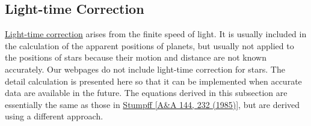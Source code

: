 \documentclass[12pt]{article}
\begin{document}
\subsection{Light-time Correction}

\href{https://en.wikipedia.org/wiki/Light-time_correction}{Light-time correction} 
arises from the finite speed of light. It is usually included in the calculation of 
the apparent positions of planets, but usually not applied to the positions of stars 
because their motion and distance are not known accurately. Our webpages 
do not include light-time correction for stars. The detail calculation is presented here 
so that it can be implemented when accurate data are available in the future. 
The equations derived in this subsection are essentially the same as those 
in \href{http://adsabs.harvard.edu/abs/1985A%26A...144..232S}{Stumpff 
[A\&A 144, 232 (1985)]}, but are derived using a different approach.
\end{document}
